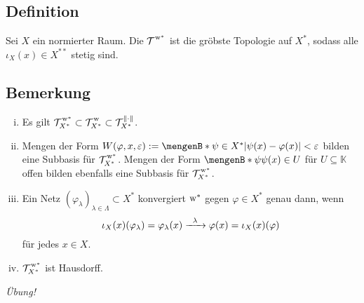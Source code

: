 \subsection[Definition: Die $\w^*$-Topologie auf $X^*$]{Definition} %
\label{sub:58}
Sei $X$ ein normierter Raum. Die  $\weakTstar{ }$ ist die gröbste Topologie auf $X^*$, sodass alle $\iota_X(x) \in X^{**}$ stetig sind.

\subsection[Bemerkungen zur $\w^*$-Topologie auf $X^*$]{Bemerkung} %
\label{sub:59}
\begin{enumerate}[(i)]
	\item Es gilt $\weakTstar{X^*} \subset \weakT{X^*} \subset \mathcal{T}^{\norm{\cdot}}_{X^*}$.
	\item Mengen der Form $W(\varphi,x, \varepsilon) := \set[\psi \in X^*]{\abs*{\psi(x)- \varphi(x)}< \varepsilon}$ bilden eine Subbasis für $\weakTstar{X^*}$.
	Mengen der Form $\set[\psi]{ \psi(x) \in U}$ für $U \subseteq \mathds{K}$ offen bilden ebenfalls eine Subbasis für $\weakTstar{X^*}$.
	\item Ein Netz $(\varphi_\lambda)_{\lambda \in \Lambda} \subset X^*$ konvergiert $\w^*$ gegen $\varphi \in X^*$ genau dann, wenn 
	\[
		\iota_X(x)(\varphi_\lambda)=\varphi_\lambda(x) \xrightarrow{\minwidthbox{\lambda}{1.5em}} \varphi(x) = \iota_X(x)(\varphi)
	\]
	für jedes $x \in X$.
	\item $\weakTstar{X^*}$ ist Hausdorff.
\end{enumerate}
\emph{Übung!} 

